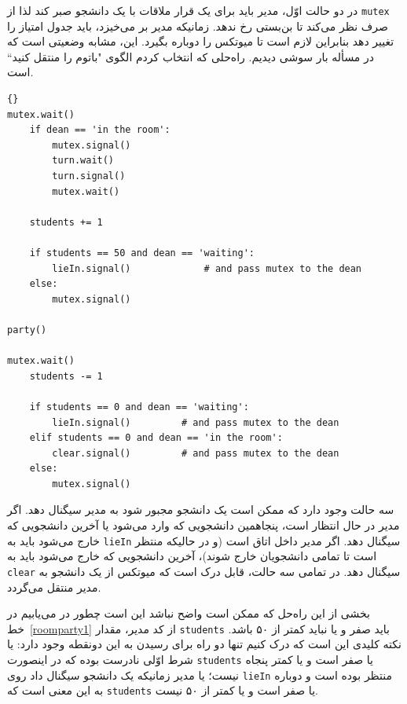 \documentclass{book}
\newcommand{\clearemptydoublepage}{}%
\begin{document}
    در دو حالت اوّل، مدیر باید برای یک قرار ملاقات با یک دانشجو صبر کند لذا از {\tt mutex} صرف نظر می‌‌کند تا بن‌بستی رخ ندهد. 
    زمانیکه مدیر بر می‌خیزد، باید جدول امتیاز را تغییر دهد بنابراین لازم است تا میوتکس را دوباره بگیرد. 
    این، مشابه وضعیتی است که در مسأله بار سوشی دیدیم. راه‌حلی که انتخاب کردم الگوی "باتوم را منتقل کنید`` است. 

\newpage
\begin{latin}
\begin{lstlisting}[title=\rl{راه‌حل اتاق پارتی (دانشجو)}]{}
mutex.wait()
    if dean == 'in the room':
        mutex.signal()
        turn.wait()
        turn.signal()
        mutex.wait()

    students += 1

    if students == 50 and dean == 'waiting':
        lieIn.signal()             # and pass mutex to the dean
    else:
        mutex.signal()

party()

mutex.wait()
    students -= 1

    if students == 0 and dean == 'waiting':
        lieIn.signal()         # and pass mutex to the dean
    elif students == 0 and dean == 'in the room':
        clear.signal()         # and pass mutex to the dean
    else:
        mutex.signal()
\end{lstlisting}
\end{latin}

    سه حالت وجود دارد که ممکن است یک دانشجو مجبور شود به مدیر سیگنال دهد. 
    اگر مدیر در حال انتظار است،  پنجاهمین دانشجویی که وارد می‌شود یا آخرین دانشجویی که خارج می‌شود باید  به {\tt lieIn} سیگنال دهد.
    اگر مدیر داخل اتاق است (و در حالیکه منتظر است تا تمامی دانشجویان خارج شوند)، آخرین دانشجویی که خارج می‌شود باید به {\tt clear} سیگنال دهد. 
    در تمامی سه حالت، قابل درک است که میوتکس از یک دانشجو به مدیر منتقل می‌گردد. 

    بخشی از این راه‌حل که ممکن است واضح نباشد این است چطور در می‌یابیم در خط~\ref{roomparty1} از کد مدیر، مقدار {\tt students}  
    باید صفر و یا نباید کمتر از ۵۰ باشد. نکته کلیدی این است که درک کنیم تنها دو راه برای رسیدن به این دونقطه وجود دارد: یا شرط اوّلی نادرست بوده 
    که در اینصورت  {\tt students} یا صفر است و یا کمتر پنجاه نیست؛‌ یا مدیر زمانیکه یک دانشجو سیگنال داد روی {\tt lieIn} منتظر بوده است و 
    دوباره به این معنی است که {\tt students}  یا صفر است و یا کمتر از ۵۰ نیست. 
    
    
\clearemptydoublepage
\end{document}
